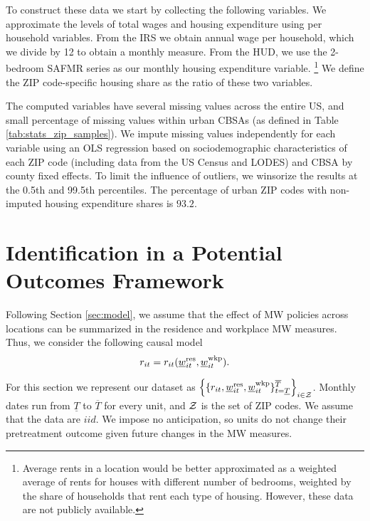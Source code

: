 To construct these data we start by collecting the following variables.
We approximate the levels of total wages and housing expenditure using per 
household variables.
From the IRS we obtain annual wage per household, which we 
divide by 12 to obtain a monthly measure.
From the HUD, we use the 2-bedroom SAFMR series as our monthly housing 
expenditure variable.%
\footnote{Average rents in a location would be better approximated as a
weighted average of rents for houses with different number of bedrooms,
weighted by the share of households that rent each type of housing.
However, these data are not publicly available.}
We define the ZIP code-specific housing share as the ratio of these two 
variables.

The computed variables have several missing values across the entire US, and 
small percentage of missing values within urban CBSAs 
(as defined in Table \ref{tab:stats_zip_samples}).
We impute missing values independently for each variable using an OLS
regression based on sociodemographic characteristics of each ZIP code 
(including data from the US Census and LODES) and CBSA by county fixed effects.
To limit the influence of outliers, we winsorize the results at the 0.5th and 
99.5th percentiles. 
The percentage of urban ZIP codes with non-imputed housing expenditure shares 
is $93.2$.

\clearpage
\section{Identification in a Potential Outcomes Framework}
\label{sec:potential_outcomes}

Following Section \ref{sec:model}, we assume that the effect of MW policies 
across locations can be summarized in the residence and workplace MW measures.
Thus, we consider the following causal model
\begin{equation}\label{eq:causal_model}
    r_{it} = r_{it}(\underline{w}_{it}^{\text{res}}, \underline{w}_{it}^{\text{wkp}}) .
\end{equation}

For this section we represent our dataset as
$\left\{\{r_{it}, \underline{w}^{\text{res}}_{it}, \underline{w}^{\text{wkp}}_{it}\}
       _{t=\underline{T}}^{\overline{T}}\right\}_{i\in\mathcal{Z}}$.
Monthly dates run from $\underline{T}$ to $\overline{T}$ for every unit,
and $\mathcal{Z}$ is the set of ZIP codes.
We assume that the data are $iid$.
We impose no anticipation, so units do not change their pretreatment outcome 
given future changes in the MW measures.

